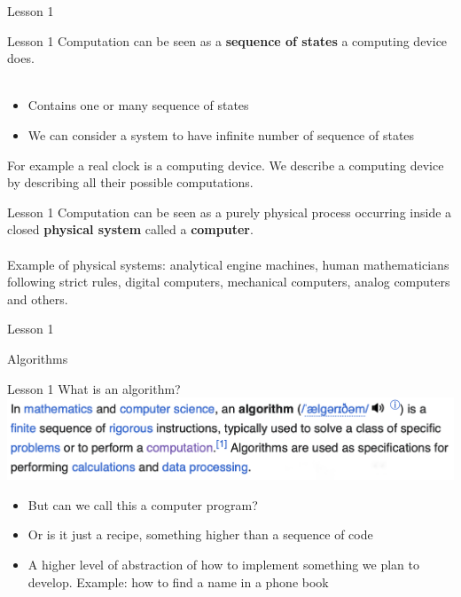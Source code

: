\documentclass[aspectratio=1610]{beamer}
\begin{document}
\begin{frame}{Lesson 1}{}
\end{frame}



\begin{frame}{Lesson 1}{}
\Large
Computation can be seen as a \textbf{sequence of states} a computing device does.\\~\\
\Large{
\begin{itemize}
    \item Contains one or many sequence of states
    \item We can consider a system to have infinite number of sequence of states
 \end{itemize}}
    
 For example a real clock is a computing device. We describe a computing device by describing all their possible computations.

\end{frame}


\begin{frame}{Lesson 1}{}
\Large
Computation can be seen as a purely physical process occurring inside a closed \textbf{physical system} called a \textbf{computer}.\\~\\ 
Example of physical systems: analytical engine machines, human mathematicians following strict rules, digital computers, mechanical computers, analog computers and others.
\end{frame}


\begin{frame}{Lesson 1}{}
\begin{center}
\Huge Algorithms
\end{center}
\end{frame}

\begin{frame}{Lesson 1}{}
{\Huge{What is an algorithm?}}
\includegraphics[scale=0.33]{Images/algorithm.png}

\Large{
\begin{itemize}
    \item But can we call this a \alert{computer program}?
    \item Or is it just a recipe, something higher than a \alert{sequence of code}
    \item A higher level of abstraction of how to implement something we plan to develop. Example: how to find a name in a phone book
\end{itemize}}

\end{frame}
\end{document}
